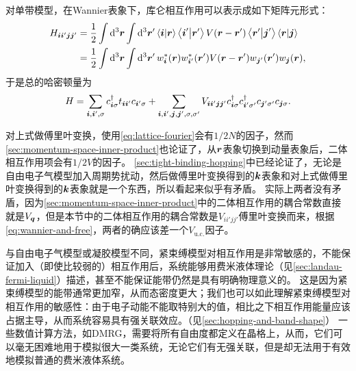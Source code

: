 对单带模型，在Wannier表象下，库仑相互作用可以表示成如下矩阵元形式：
\begin{equation}
    \begin{aligned}
        H_{\vb*{i} \vb*{i}' \vb*{j} \vb*{j}'} &= \frac{1}{2} \int \dd[3]{\vb*{r}} \int \dd[3]{\vb*{r}'} \braket{\vb*{i}}{\vb*{r}} \braket{\vb*{i}'}{\vb*{r}'} V(\vb*{r} - \vb*{r}') \braket{\vb*{r}'}{\vb*{j}'} \braket{\vb*{r}}{\vb*{j}} \\
        &= \frac{1}{2} \int \dd[3]{\vb*{r}} \int \dd[3]{\vb*{r}'} w_{\vb*{i}}^*(\vb*{r}) w_{\vb*{i}'}^*(\vb*{r}') V(\vb*{r} - \vb*{r}') w_{\vb*{j}'}(\vb*{r}') w_{\vb*{j}}(\vb*{r}),
    \end{aligned}
    \label{eq:wannier-basis-interaction}
\end{equation}
于是总的哈密顿量为
\begin{equation}
    H = \sum_{\vb*{i}, \vb*{i}', \sigma} c^\dagger_{\vb*{i} \sigma} t_{\vb*{i} \vb*{i}'} c_{\vb*{i}' \sigma} + \sum_{\vb*{i}, \vb*{i}', \vb*{j}, \vb*{j}', \sigma, \sigma'} V_{\vb*{i} \vb*{i}' \vb*{j} \vb*{j}'} c^\dagger_{\vb*{i} \sigma} c^\dagger_{\vb*{i}' \sigma'} c_{\vb*{j}' \sigma'} c_{\vb*{j} \sigma}.
\end{equation}

对上式做傅里叶变换，使用\eqref{eq:lattice-fourier}会有$1/2N$的因子，然而\autoref{sec:momentum-space-inner-product}也论证了，从$\vb*{r}$表象切换到动量表象后，二体相互作用项会有$1/2V$的因子。
\autoref{sec:tight-binding-hopping}中已经论证了，无论是自由电子气模型加入周期势扰动，然后做傅里叶变换得到的$\vb*{k}$表象和对上式做傅里叶变换得到的$\vb*{k}$表象就是一个东西，所以看起来似乎有矛盾。
实际上两者没有矛盾，因为\autoref{sec:momentum-space-inner-product}中的二体相互作用的耦合常数直接就是$V_{\vb*{q}}$，但是本节中的二体相互作用的耦合常数是$V_{i i' j j'}$傅里叶变换而来，根据\eqref{eq:wannier-and-free}，两者的确应该差一个$V_\text{u.c.}$因子。

与自由电子气模型或凝胶模型不同，紧束缚模型对相互作用是非常敏感的，不能保证加入（即使比较弱的）相互作用后，系统能够用费米液体理论（见\autoref{sec:landau-fermi-liquid}）描述，甚至不能保证能带仍然是具有明确物理意义的。
这是因为紧束缚模型的能带通常更加窄，从而态密度更大；我们也可以如此理解紧束缚模型对相互作用的敏感性：由于电子动能不能取特别大的值，相比之下相互作用能量应该占据主导，从而系统容易具有强关联效应。（见\autoref{sec:hopping-and-band-shape}）
一些数值计算方法，如DMRG，需要将所有自由度都定义在晶格上，从而，它们可以毫无困难地用于模拟很大一类系统，无论它们有无强关联，但是却无法用于有效地模拟普通的费米液体系统。


